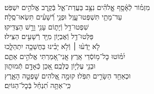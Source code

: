 \documentclass[twoside, openany, parskip=half, 11pt]{book}
\begin{document}
\\
\vspace{-1.5\baselineskip}
\begin{narrow}
%
מִזְמ֗וֹר לְֿאָ֫סָ֥ף \hfill \break
אֱֽלֹהִ֗ים נִצָּ֥ב בַּעֲדַת־אֵ֑ל \hfill בְּֿקֶ֖רֶב אֱלֹהִ֣ים יִשְׁפֹּֽט׃ \\
עַד־מָתַ֥י תִּשְׁפְּטוּ־עָ֑וֶל \hfill וּפְנֵ֥י רְֿ֝שָׁעִ֗ים תִּשְׂאוּ־סֶֽלָה׃ \\
שִׁפְטוּ־דַ֥ל וְֿיָת֑וֹם \hfill עָנִ֖י וָרָ֣שׁ הַצְדִּֽיקוּ׃ \\
פַּלְּטוּ־דַ֥ל וְֿאֶבְי֑וֹן \hfill מִיַּ֖ד רְֿשָׁעִ֣ים הַצִּֽילוּ׃ \\
לֹ֤א יָדְֿע֨וּ ׀ וְֿלֹ֥א יָבִ֗ינוּ \hfill בַּחֲשֵׁכָ֥ה יִתְהַלָּ֑כוּ \\ יִ֝מּ֗וֹטוּ כׇּל־מ֥וֹסְֿדֵי אָֽרֶץ׃ \hfill
אֲֽנִי־אָ֭מַרְתִּי אֱלֹהִ֣ים אַתֶּ֑ם \\ וּבְנֵ֖י עֶלְי֣וֹן כֻּלְּכֶֽם׃ \hfill
אָ֭כֵן כְּֿאָדָ֣ם תְּֿמוּת֑וּן \\ וּכְאַחַ֖ד הַשָּׂרִ֣ים תִּפֹּֽלוּ׃ \hfill
קוּמָ֣ה אֱ֭לֹהִים שׇׁפְטָ֣ה הָאָ֑רֶץ \\ כִּֽי־אַתָּ֥ה תִ֝נְחַ֗ל בְּֿכׇל־הַגּוֹיִֽם׃ \hfill \break
\end{narrow}
\end{document}
